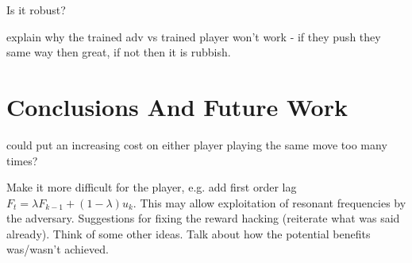 \documentclass[../main.tex]{subfiles}
\begin{document}
Is it robust?

explain why the trained adv vs trained player won't work - if they push they same way then great, if not then it is rubbish.

\section{Conclusions And Future Work}
could put an increasing cost on either player playing the same move too many times?

Make it more difficult for the player, e.g. add first order lag $F_t = \lambda F_{k-1} + (1-\lambda)u_k$. This may allow exploitation of resonant frequencies by the adversary.
Suggestions for fixing the reward hacking (reiterate what was said already).
Think of some other ideas.
Talk about how the potential benefits was/wasn't achieved.

\onlyinsubfile{\appendix}
\onlyinsubfile{}
\end{document}
